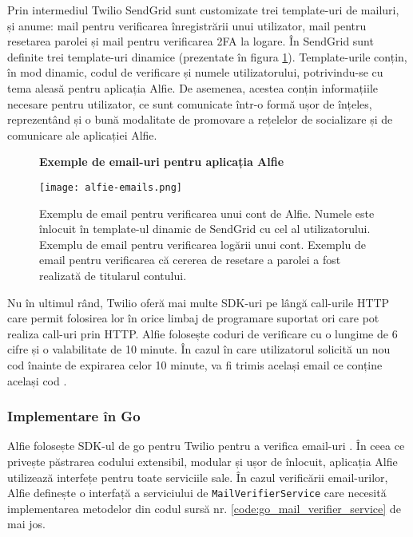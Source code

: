 Prin intermediul Twilio SendGrid sunt customizate trei template-uri de mailuri, și anume: mail pentru verificarea înregistrării unui utilizator, mail pentru resetarea parolei și mail pentru verificarea 2FA la logare. În SendGrid sunt definite trei template-uri dinamice (prezentate în figura \ref{fig:alfie_emails}). Template-urile conțin, în mod dinamic, codul de verificare și numele utilizatorului, potrivindu-se cu tema aleasă pentru aplicația Alfie. De asemenea, acestea conțin informațiile necesare pentru utilizator, ce sunt comunicate într-o formă ușor de înțeles, reprezentând și o bună modalitate de promovare a rețelelor de socializare și de comunicare ale aplicației Alfie.

\begin{figure}[H]
    \centering
    \textbf{Exemple de email-uri pentru aplicația Alfie}\par\medskip
    \texttt{[image: alfie-emails.png]}
    \caption{Exemplu de email pentru verificarea unui cont de Alfie. Numele este înlocuit în template-ul dinamic de SendGrid cu cel al utilizatorului. Exemplu de email pentru verificarea logării unui cont. Exemplu de email pentru verificarea că cererea de resetare a parolei a fost realizată de titularul contului.}
    \label{fig:alfie_emails}
\end{figure}

Nu în ultimul rând, Twilio oferă mai multe SDK-uri pe lângă call-urile HTTP care permit folosirea lor în orice limbaj de programare suportat ori care pot realiza call-uri prin HTTP. Alfie folosește coduri de verificare cu o lungime de 6 cifre și o valabilitate de 10 minute. În cazul în care utilizatorul solicită un nou cod înainte de expirarea celor 10 minute, va fi trimis același email ce conține același cod \cite{twilioVerification}.

\subsubsection{Implementare în Go}

Alfie folosește SDK-ul de go pentru Twilio pentru a verifica email-uri \cite{twilioVerifyEmail}. În ceea ce privește păstrarea codului extensibil, modular și ușor de înlocuit, aplicația Alfie utilizează interfețe pentru toate serviciile sale. În cazul verificării email-urilor, Alfie definește o interfață a serviciului de \texttt{MailVerifierService} care necesită implementarea metodelor din codul sursă nr. \ref{code:go_mail_verifier_service} de mai jos.

